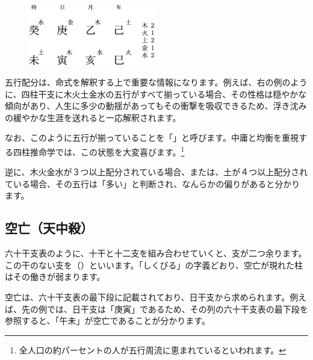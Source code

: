 \documentclass[a5paper,11pt,dvipdfmx]{tarticle}
\begin{document}
\begin{figure}[h]
  \includegraphics[width=55mm,angle=90]{figs/figure3-12.eps}
\end{figure}

五行配分は、命式を解釈する上で重要な情報になります。例えば、右の例のように、四柱干支に木火土金水の五行がすべて揃っている場合、その性格は穏やかな傾向があり、人生に多少の動揺があってもその衝撃を吸収できるため、浮き沈みの緩やかな生涯を送れると一応解釈されます。

なお、このように五行が揃っていることを「」と呼びます。中庸と均衡を重視する四柱推命学では、この状態を大変喜びます。\footnote{全人口の約パーセントの人が五行周流に恵まれているといわれます。}

逆に、木火金水が３つ以上配分されている場合、または、土が４つ以上配分されている場合、その五行は「多い」と判断され、なんらかの偏りがあると分かります。

\subsection{空亡（天中殺）}
六十干支表のように、十干と十二支を組み合わせていくと、支が二つ余ります。この干のない支を（）といいます。「しくびる」の字義どおり、空亡が現れた柱はその働きが弱まります。

空亡は、六十干支表の最下段に記載されており、日干支から求められます。例えば、先の例では、日干支は「庚寅」であるため、その列の六十干支表の最下段を参照すると、「午未」が空亡であることが分かります。
\end{document}
